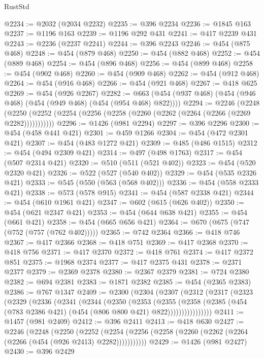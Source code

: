 \begin{lexlean}{RustStd}
\begin{coremodule}
@2234 := @2032 (@2034 @2232)
@2235 := @396 @2234
@2236 := @1845 @163
@2237 := @1196 @163
@2239 := @1196 @292 @431
@2241 := @417 @2239 @431
@2243 := @2236 (@2237 @2241)
@2244 := @396 @2243
@2246 := @454 (@875 @468)
@2248 := @454 (@879 @468)
@2250 := @454 (@882 @468)
@2252 := @454 (@889 @468)
@2254 := @454 (@896 @468)
@2256 := @454 (@899 @468)
@2258 := @454 (@902 @468)
@2260 := @454 (@909 @468)
@2262 := @454 (@912 @468)
@2264 := @454 (@916 @468)
@2266 := @454 (@921 @468)
@2267 := @418 @625
@2269 := @454 (@926 @2267)
@2282 := @663 (@454 (@937 @468) (@454 (@946 @468) (@454 (@949 @468) (@454 (@954 @468) @822))))
@2294 := @2246
    (@2248 (@2250 (@2252 (@2254 (@2256 (@2258 (@2260 (@2262 (@2264 (@2266 (@2269 @2282)))))))))))
@2296 := @1426 (@981 @2294)
@2297 := @396 @2296
@2300 := @454 (@458 @441 @421)
@2301 := @459 @1266
@2304 := @454 (@472 @2301 @421)
@2307 := @454 (@483 @1272 @421)
@2309 := @485 (@486 @1515)
@2312 := @454 (@494 @2309 @421)
@2314 := @497 (@498 @1763)
@2317 := @454 (@507 @2314 @421)
@2320 := @510 (@511 (@521 @402))
@2323 := @454 (@520 @2320 @421)
@2326 := @522 (@527 (@540 @402))
@2329 := @454 (@535 @2326 @421)
@2333 := @545 (@550 (@563 (@568 @402)))
@2336 := @454 (@558 @2333 @421)
@2338 := @573 (@578 @915)
@2341 := @454 (@587 @2338 @421)
@2344 := @454 (@610 @1961 @421)
@2347 := @602 (@615 (@626 @402))
@2350 := @454 (@621 @2347 @421)
@2353 := @454 (@644 @638 @421)
@2355 := @454 (@661 @421)
@2358 := @454 (@665 @656 @421)
@2364 := @670 (@675 (@747 (@752 (@757 (@762 @402)))))
@2365 := @742 @2364
@2366 := @418 @746
@2367 := @417 @2366
@2368 := @418 @751
@2369 := @417 @2368
@2370 := @418 @756
@2371 := @417 @2370
@2372 := @418 @761
@2374 := @417 @2372 @851
@2375 := @1968 @2374
@2377 := @417 @2375 @431
@2378 := @2371 @2377
@2379 := @2369 @2378
@2380 := @2367 @2379
@2381 := @724 @2380
@2382 := @694 @2381
@2383 := @1871 @2382
@2385 := @454 (@2365 @2383)
@2386 := @767 @1347
@2409 := @2300
    (@2304
      (@2307
        (@2312
          (@2317
            (@2323
              (@2329
                (@2336
                  (@2341
                    (@2344
                      (@2350
                        (@2353
                          (@2355
                            (@2358
                              (@2385
                                (@454 (@783 @2386 @421) (@454 (@806 @800 @421) @822))))))))))))))))
@2411 := @1457 (@981 @2409)
@2412 := @396 @2411
@2413 := @418 @630
@2427 := @2246
    (@2248
      (@2250
        (@2252 (@2254 (@2256 (@2258 (@2260 (@2262 (@2264 (@2266 (@454 (@926 @2413) @2282)))))))))))
@2429 := @1426 (@981 @2427)
@2430 := @396 @2429

\end{coremodule}
\end{lexlean}
